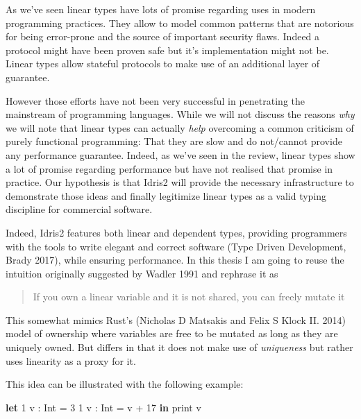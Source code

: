 \documentclass[
]{article}
\newenvironment{Shaded}{}{}
\newcommand{\DataTypeTok}[1]{\textcolor[rgb]{0.56,0.13,0.00}{#1}}
\newcommand{\DecValTok}[1]{\textcolor[rgb]{0.25,0.63,0.44}{#1}}
\newcommand{\FunctionTok}[1]{\textcolor[rgb]{0.02,0.16,0.49}{#1}}
\newcommand{\KeywordTok}[1]{\textcolor[rgb]{0.00,0.44,0.13}{\textbf{#1}}}
\newcommand{\NormalTok}[1]{#1}
\newcommand{\OtherTok}[1]{\textcolor[rgb]{0.00,0.44,0.13}{#1}}
\begin{document}
As we've seen linear types have lots of promise regarding uses in modern
programming practices. They allow to model common patterns that are
notorious for being error-prone and the source of important security
flaws. Indeed a protocol might have been proven safe but it's
implementation might not be. Linear types allow stateful protocols to
make use of an additional layer of guarantee.

However those efforts have not been very successful in penetrating the
mainstream of programming languages. While we will not discuss the
reasons \emph{why} we will note that linear types can actually
\emph{help} overcoming a common criticism of purely functional
programming: That they are slow and do not/cannot provide any
performance guarantee. Indeed, as we've seen in the review, linear types
show a lot of promise regarding performance but have not realised that
promise in practice. Our hypothesis is that Idris2 will provide the
necessary infrastructure to demonstrate those ideas and finally
legitimize linear types as a valid typing discipline for commercial
software.

Indeed, Idris2 features both linear and dependent types, providing
programmers with the tools to write elegant and correct software (Type
Driven Development, Brady 2017), while ensuring performance. In this
thesis I am going to reuse the intuition originally suggested by Wadler
1991 and rephrase it as

\begin{quote}
If you own a linear variable and it is not shared, you can freely mutate
it
\end{quote}

This somewhat mimics Rust's (Nicholas D Matsakis and Felix S Klock II.
2014) model of ownership where variables are free to be mutated as long
as they are uniquely owned. But differs in that it does not make use of
\emph{uniqueness} but rather uses linearity as a proxy for it.

This idea can be illustrated with the following example:

\begin{Shaded}
\begin{Highlighting}[]
\KeywordTok{let} \DecValTok{1}\NormalTok{ v }\OtherTok{:} \DataTypeTok{Int} \FunctionTok{=} \DecValTok{3}
    \DecValTok{1}\NormalTok{ v\textquotesingle{} }\OtherTok{:} \DataTypeTok{Int} \FunctionTok{=}\NormalTok{ v }\FunctionTok{+} \DecValTok{17}
 \KeywordTok{in}\NormalTok{ print v\textquotesingle{}}
\end{Highlighting}
\end{Shaded}
\end{document}
